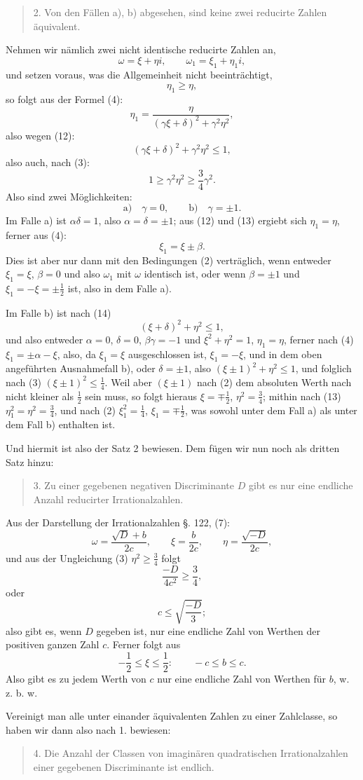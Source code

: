 \documentclass[11pt]{article}
\begin{document}
\begin{quote}
2. Von den Fällen a), b) abgesehen, sind keine zwei reducirte Zahlen äquivalent.
\end{quote}

Nehmen wir nämlich zwei nicht identische reducirte Zahlen an,
\[
\tag{11}       \omega=\xi+\eta i,
        \qquad
        \omega_1=\xi_1+\eta_1 i,
\]
und setzen voraus, was die Allgemeinheit nicht beeinträchtigt,
\[
\tag{12}       \eta_1\ge\eta,
\]
so folgt aus der Formel (4):
\[
\tag{13}       \eta_1=
\frac{\eta}{(\gamma\xi+\delta)^2+\gamma^2\eta^2},
\]
also wegen (12):
\[
\tag{14}       (\gamma\xi+\delta)^2+\gamma^2\eta^2\le1,
\]
also auch, nach (3):
\[
\tag{15}       1\ge \gamma^2\eta^2\ge \frac34\gamma^2.
\]
Also sind zwei Möglichkeiten:
\[
        \text{a)}\quad \gamma=0,
        \qquad
        \text{b)}\quad \gamma=\pm1.
\]
Im Falle a) ist $\alpha\delta=1$, also $\alpha=\delta=\pm1$; aus (12) und (13) ergiebt sich $\eta_1=\eta$, ferner aus (4):
\[
        \xi_1=\xi\pm\beta.
\]
Dies ist aber nur dann mit den Bedingungen (2) verträglich, wenn entweder $\xi_1=\xi$, $\beta=0$ und also $\omega_1$ mit $\omega$ identisch ist, oder wenn $\beta=\pm1$ und $\xi_1=-\xi=\pm\frac12$ ist, also in dem Falle a).

Im Falle b) ist nach (14)
\[
        (\xi+\delta)^2+\eta^2\le1,
\]
und also entweder $\alpha=0$, $\delta=0$, $\beta\gamma=-1$ und $\xi^2+\eta^2=1$, $\eta_1=\eta$, ferner nach (4) $\xi_1=\pm\alpha-\xi$, also, da $\xi_1=\xi$ ausgeschlossen ist, $\xi_1=-\xi$, und in dem oben angeführten Ausnahmefall b), oder $\delta=\pm1$, also $(\xi\pm1)^2+\eta^2\le1$, und folglich nach (3) $(\xi\pm1)^2\le\frac14$. Weil aber $(\xi\pm1)$ nach (2) dem absoluten Werth nach nicht kleiner als $\frac12$ sein muss, so folgt hieraus $\xi=\mp\frac12$, $\eta^2=\frac34$; mithin nach (13) $\eta_1^2=\eta^2=\frac34$, und nach (2) $\xi_1^2=\frac14$, $\xi_1=\mp\frac12$, was sowohl unter dem Fall a) als unter dem Fall b) enthalten ist.

Und hiermit ist also der Satz 2 bewiesen. Dem fügen wir nun noch als dritten Satz hinzu:
\begin{quote}
3. Zu einer gegebenen negativen Discriminante $D$ gibt es nur eine endliche Anzahl reducirter Irrationalzahlen.
\end{quote}
Aus der Darstellung der Irrationalzahlen §. 122, (7):
\[
        \omega=\frac{\sqrt D+b}{2c},
        \qquad
        \xi=\frac b{2c},
        \qquad
        \eta=\frac{\sqrt{-D}}{2c},
\]
und aus der Ungleichung (3) $\eta^2\ge\frac34$ folgt
\[
        \frac{-D}{4c^2}\ge\frac34,
\]
oder
\[
        c\le \sqrt{\frac{-D}{3}};
\]
also gibt es, wenn $D$ gegeben ist, nur eine endliche Zahl von Werthen der positiven ganzen Zahl $c$. Ferner folgt aus
\[
        -\frac12\le\xi\le\frac12:
        \qquad
        -c\le b\le c.
\]
Also gibt es zu jedem Werth von $c$ nur eine endliche Zahl von Werthen für $b$, w. z. b. w.

Vereinigt man alle unter einander äquivalenten Zahlen zu einer Zahlclasse, so haben wir dann also nach 1. bewiesen:
\begin{quote}
4. Die Anzahl der Classen von imaginären quadratischen Irrationalzahlen einer gegebenen Discriminante ist endlich.
\end{quote}
\end{document}
